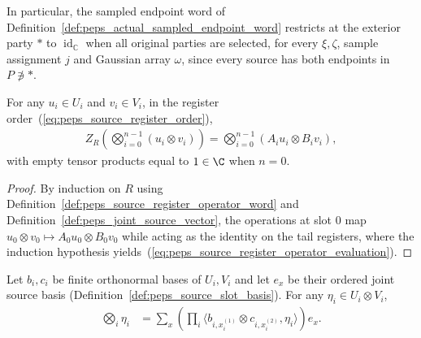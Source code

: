 In particular, the sampled endpoint word of
Definition~\ref{def:peps_actual_sampled_endpoint_word} restricts at the exterior
party $*$ to $\operatorname{id}_{\mathbb C}$ when all original parties are
selected, for every $\xi,\zeta$, sample assignment $j$ and Gaussian array
$\omega$, since every source has both endpoints in $P\not\ni *$.


\begin{lemma}
    \label{thm:peps_source_register_operator_evaluation}
    \leanok
    For any $u_i\in U_i$ and $v_i\in V_i$, in the register
    order~(\ref{eq:peps_source_register_order}),
    \begin{align}
        Z_R\left(\bigotimes_{i=0}^{n-1}(u_i\otimes v_i)\right)
        =\bigotimes_{i=0}^{n-1}(A_i u_i\otimes B_i v_i),
        \label{eq:peps_source_register_operator_evaluation}
    \end{align}
    with empty tensor products equal to $1\in\C$ when $n=0$.
\end{lemma}

\begin{proof}
    \leanok
    By induction on $R$ using Definition~\ref{def:peps_source_register_operator_word}
    and Definition~\ref{def:peps_joint_source_vector}, the operations at slot $0$
    map $u_0\otimes v_0\mapsto A_0u_0\otimes B_0v_0$ while acting as the
    identity on the tail registers, where the induction hypothesis yields~(\ref{eq:peps_source_register_operator_evaluation}).
\end{proof}

\begin{lemma}
    \label{thm:peps_joint_source_vector_coordinates}
    \leanok
    Let $b_i,c_i$ be finite orthonormal bases of $U_i,V_i$ and let $e_x$ be
    their ordered joint source basis (Definition~\ref{def:peps_source_slot_basis}).
    For any $\eta_i\in U_i\otimes V_i$,
    \begin{align}
        \bigotimes_i\eta_i
         & =\sum_x\left(\prod_i
        \langle b_{i,x_i^{(1)}}\otimes c_{i,x_i^{(2)}},\eta_i\rangle\right)e_x.
        \label{eq:peps_joint_source_coordinates}
    \end{align}
\end{lemma}


